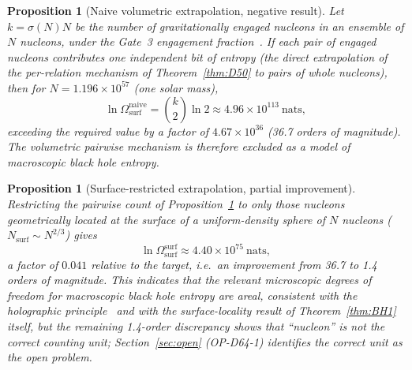 \documentclass[12pt,a4paper]{article}
\newtheorem{proposition}[theorem]{Proposition}
\newcommand{\Omegasurf}{\Omega_{\mathrm{surf}}}
\begin{document}
\begin{proposition}[Naive volumetric extrapolation, negative result]
\label{prop:negative1}
Let $k = \sigma(N)N$ be the number of gravitationally engaged nucleons in an ensemble of $N$ nucleons, under the Gate~3 engagement fraction~\cite{PDL_D36_2026}. If each pair of engaged nucleons contributes one independent bit of entropy (the direct extrapolation of the per-relation mechanism of Theorem~\ref{thm:D50} to pairs of whole nucleons), then for $N=1.196\times10^{57}$ (one solar mass),
\begin{equation}
\ln\Omegasurf^{\mathrm{naive}} = \binom{k}{2}\ln 2 \approx 4.96\times10^{113}~\mathrm{nats},
\end{equation}
exceeding the required value by a factor of $4.67\times10^{36}$ (36.7 orders of magnitude). The volumetric pairwise mechanism is therefore excluded as a model of macroscopic black hole entropy.
\end{proposition}

\begin{proposition}[Surface-restricted extrapolation, partial improvement]
\label{prop:negative2}
Restricting the pairwise count of Proposition~\ref{prop:negative1} to only those nucleons geometrically located at the surface of a uniform-density sphere of $N$ nucleons ($N_{\mathrm{surf}} \sim N^{2/3}$) gives
\begin{equation}
\ln\Omegasurf^{\mathrm{surf}} \approx 4.40\times10^{75}~\mathrm{nats},
\end{equation}
a factor of $0.041$ relative to the target, i.e.\ an improvement from 36.7 to 1.4 orders of magnitude. This indicates that the relevant microscopic degrees of freedom for macroscopic black hole entropy are areal, consistent with the holographic principle~\cite{Hooft1993,Susskind1995} and with the surface-locality result of Theorem~\ref{thm:BH1} itself, but the remaining 1.4-order discrepancy shows that ``nucleon'' is not the correct counting unit; Section~\ref{sec:open} (OP-D64-1) identifies the correct unit as the open problem.
\end{proposition}
\end{document}
